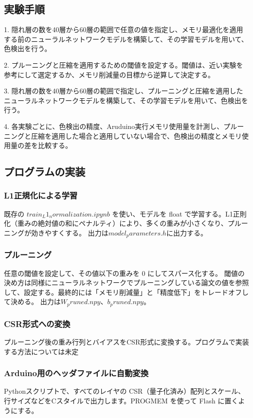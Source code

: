 \documentclass[uplatex,dvipdfmx]{jsarticle}
\begin{document}
\subsection{実験手順}
1. 隠れ層の数を40層から60層の範囲で任意の値を指定し、メモリ最適化を適用する前のニューラルネットワークモデルを構築して、その学習モデルを用いて、色検出を行う。\par
2. プルーニングと圧縮を適用するための閾値を設定する。閾値は、近い実験を参考にして選定するか、メモリ削減量の目標から逆算して決定する。\par
3. 隠れ層の数を40層から60層の範囲で指定し、プルーニングと圧縮を適用したニューラルネットワークモデルを構築して、その学習モデルを用いて、色検出を行う。\par
4. 各実験ごとに、色検出の精度、Aruduino実行メモリ使用量を計測し、プルーニングと圧縮を適用した場合と適用していない場合で、色検出の精度とメモリ使用量の差を比較する。\par
\subsection{プログラムの実装}
\subsubsection{L1正規化による学習}
既存の $train_L1_normalization.ipynb$ を使い、モデルを float で学習する。L1正則化（重みの絶対値の和にペナルティ）により、多くの重みが小さくなり、プルーニングが効きやすくする。
出力は$model_parameters.h$に出力する。
\subsubsection{プルーニング}
任意の閾値を設定して、その値以下の重みを 0 にしてスパース化する。
閾値の決め方は同様にニューラルネットワークでプルーニングしている論文の値を参照して、設定する。最終的には「メモリ削減量」と「精度低下」をトレードオフして決める。
出力は$W_pruned.npy、b_pruned.npy$。
\subsubsection{CSR形式への変換}
プルーニング後の重み行列とバイアスをCSR形式に変換する。プログラムで実装する方法については未定
\subsubsection{Arduino用のヘッダファイルに自動変換}
Pythonスクリプトで、すべてのレイヤの CSR（量子化済み）配列とスケール、行サイズなどをCスタイルで出力します。PROGMEM を使って Flash に置くようにする。
\end{document}
